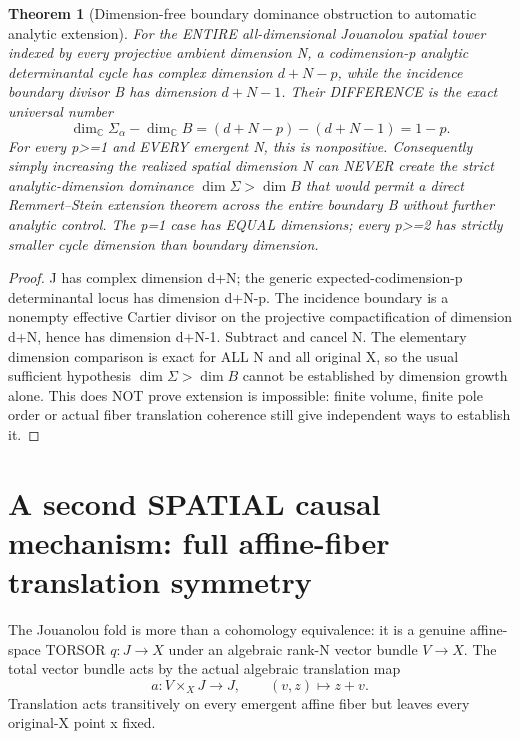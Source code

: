 \documentclass[11pt]{article}
\newtheorem{theorem}{Theorem}[section]
\begin{document}
\begin{theorem}[Dimension-free boundary dominance obstruction to automatic analytic extension]
For the ENTIRE all-dimensional
Jouanolou spatial tower indexed by
every projective ambient dimension
N, a codimension-p analytic
determinantal cycle has complex
dimension $d+N-p$, while the
incidence boundary divisor B has
dimension $d+N-1$. Their
DIFFERENCE is the exact
universal number
\[
 \boxed{
 \dim_\mathbb C \Sigma_\alpha-
 \dim_\mathbb C B
 =(d+N-p)-(d+N-1)=1-p.
 }                                                        \tag{11.3}
\]
For every p>=1 and EVERY
emergent N, this is nonpositive.
Consequently simply increasing
the realized spatial dimension
N can NEVER create the strict
analytic-dimension dominance
$\dim\Sigma>\dim B$ that
would permit a direct
Remmert--Stein extension theorem
across the entire boundary
B without further analytic
control. The p=1 case has
EQUAL dimensions; every p>=2
has strictly smaller cycle
dimension than boundary
dimension.
\end{theorem}
\begin{proof}
J has complex dimension d+N;
the generic expected-codimension-p
determinantal locus has dimension
d+N-p. The incidence boundary
is a nonempty effective Cartier
divisor on the projective
compactification of dimension
d+N, hence has dimension
d+N-1. Subtract and cancel N.
The elementary dimension
comparison is exact for ALL N
and all original X, so the
usual sufficient hypothesis
$\dim\Sigma>\dim B$ cannot
be established by dimension
growth alone.
This does NOT prove extension
is impossible: finite volume,
finite pole order or actual
fiber translation coherence
still give independent ways
to establish it.
\end{proof}

\section{A second SPATIAL causal mechanism: full affine-fiber translation symmetry}

The Jouanolou fold is more than a
cohomology equivalence: it is a
genuine affine-space TORSOR
$q:J\to X$ under an algebraic rank-N
vector bundle $V\to X$.
The total vector bundle acts by
the actual algebraic translation map
\[
 a:V\times_X J\longrightarrow J,
 \qquad (v,z)\longmapsto z+v.                    \tag{10.1}
\]
Translation acts transitively on every
emergent affine fiber but leaves
every original-X point x fixed.
\end{document}
